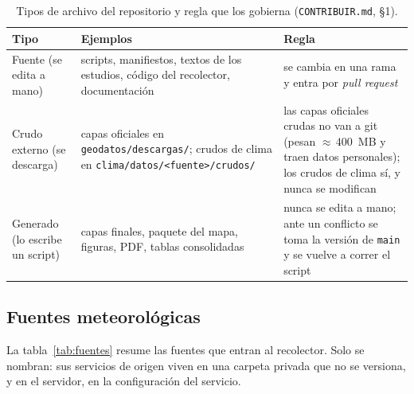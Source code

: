 \documentclass{sosg-informe}
\begin{document}
\begin{table}[ht]
  \centering\small
  \caption{Tipos de archivo del repositorio y regla que los gobierna (\texttt{CONTRIBUIR.md}, §1).}
  \label{tab:tipos}
  \begin{tabularx}{\linewidth}{l>{\raggedright\arraybackslash}X>{\raggedright\arraybackslash}X}
    \toprule
    Tipo & Ejemplos & Regla \\
    \midrule
    Fuente (se edita a mano) & scripts, manifiestos, textos de los estudios, código del recolector, documentación & se cambia en una rama y entra por \emph{pull request} \\
    \addlinespace
    Crudo externo (se descarga) & capas oficiales en \texttt{geodatos/descargas/}; crudos de clima en \texttt{clima/datos/<fuente>/crudos/} & las capas oficiales crudas no van a git (pesan ${\approx}\,400$~MB y traen datos personales); los crudos de clima sí, y nunca se modifican \\
    \addlinespace
    Generado (lo escribe un script) & capas finales, paquete del mapa, figuras, PDF, tablas consolidadas & nunca se edita a mano; ante un conflicto se toma la versión de \texttt{main} y se vuelve a correr el script \\
    \bottomrule
  \end{tabularx}
\end{table}

\subsection{Fuentes meteorológicas}
La tabla~\ref{tab:fuentes} resume las fuentes que entran al recolector. Solo se nombran: sus servicios de origen viven en una carpeta privada que no se versiona, y en el servidor, en la configuración del servicio.
\end{document}
